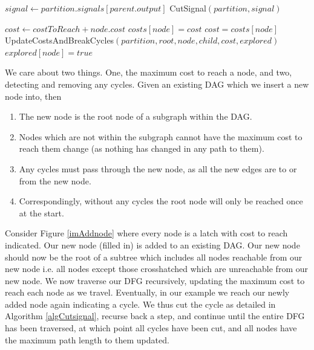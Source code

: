 \documentclass[12pt,final,oneside,a4paper]{dwThesis} %
\begin{document}
\begin{algorithm}
      \begin{algorithmic}[1]
            
        \Return \EndIf {} 

         \State $signal \gets partition.signals[parent.output]$  
         \State CutSignal$(partition, signal)$

        \Return
        \EndIf 
         \State $cost \gets costToReach+node.cost$
         \State $costs[node] = cost$ \Else 
         \State
         $cost = costs[node]$ \EndIf {} 
         \State
         UpdateCostsAndBreakCycles$(partition, root, node, child, cost,
         explored)$ \EndFor 
         \State $explored[node] = true$ \EndProcedure

      \end{algorithmic}

   \end{algorithm}
   We care about two things. One, the
   maximum cost to reach a node, and two, detecting and removing any cycles.
   Given an existing \gls{DAG} which we insert a new node into, then

   \begin{enumerate}

      \item The new node is the root node of a subgraph within the \gls{DAG}.
      \item Nodes which are not within the subgraph cannot have the maximum
         cost to reach them change (as nothing has changed in any path to
         them).
      \item Any cycles must pass through the new node, as all the new edges are
         to or from the new node.
      \item Correspondingly, without any cycles the root node will only be
         reached once at the start.  
   \end{enumerate}
   Consider Figure
   \ref{imAddnode} where every node is a latch with cost to reach indicated.
   Our new node (filled in) is added to an existing \gls{DAG}. Our new node
   should now be the root of a subtree which includes all nodes reachable
   from our new node i.e. all nodes except those crosshatched which are
   unreachable from our new node.  We now traverse our \gls{DFG}
   recursively, updating the maximum cost to reach each node as we travel.
   Eventually, in our example we reach our newly added node again indicating
   a cycle. We thus cut the cycle as detailed in Algorithm
   \ref{algCutsignal}, recurse back a step,
   and continue until the entire \gls{DFG} has been traversed, at which
   point all cycles have been cut, and all nodes have the maximum path
   length to them updated.
   
\end{document}
